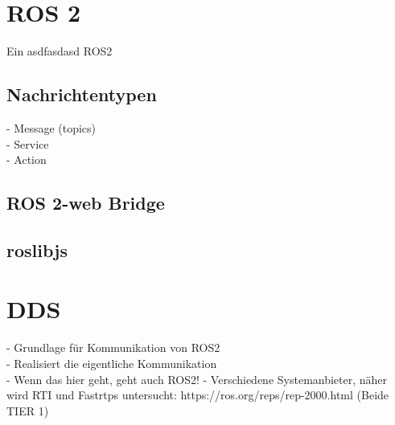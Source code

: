 	
	\section{ROS 2}
	\label{Grundlagen:ROS2}
		Ein asdfasdasd
		\cite{ros2Basic}
		\gls{ROS2}
	

		\subsection{Nachrichtentypen}
		\label{Grundlagen:ROS2:Nachrichtentypen}
			- Message (topics)\\
			- Service\\
			- Action
			
		\subsection{ROS 2-web Bridge}
		\label{Grundlagen:ROS2:2WebBridge}
			
		\subsection{roslibjs}
		\label{Grundlagen:ROS2:RosLibJS}
	
	\section{DDS}
	\label{Grundlagen:DDS}
		- Grundlage für Kommunikation von ROS2\\
		- Realisiert die eigentliche Kommunikation\\
		- Wenn das hier geht, geht auch ROS2!
		- Verschiedene Systemanbieter, näher wird RTI und Fastrtps untersucht: https://ros.org/reps/rep-2000.html  (Beide TIER 1)
		
	
		
		
